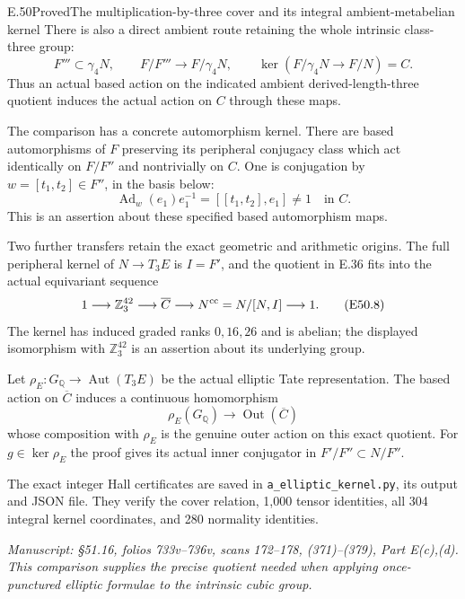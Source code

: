 \begin{statement}{E.50}{Proved}{The multiplication-by-three cover and its integral ambient-metabelian kernel}
There is also a direct ambient route retaining
the whole intrinsic class-three group:
\[
 F'''\subset\gamma_4N,\qquad
 F/F'''\longrightarrow F/\gamma_4N,
 \qquad
 \ker(F/\gamma_4N\longrightarrow F/N)=C.
 \tag{E50.6}
\]
Thus an actual based action on the indicated
ambient derived-length-three quotient induces
the actual action on $C$ through these maps.

The comparison has a concrete automorphism
kernel. There are based automorphisms of $F$
preserving its peripheral conjugacy class which
act identically on $F/F''$ and nontrivially on
$C$. One is conjugation by
$w=[t_1,t_2]\in F''$, in the basis below:
\[
 \operatorname{Ad}_w(e_1)e_1^{-1}
       =[[t_1,t_2],e_1]\ne1\quad\text{in }C.
 \tag{E50.7}
\]
This is an assertion about these specified
based automorphism maps.

Two further transfers retain the exact
geometric and arithmetic origins. The full
peripheral kernel of $N\to T_3E$ is
$I=F'$, and the quotient in E.36 fits into
the actual equivariant sequence
\[
 1\longrightarrow\mathbb Z_3^{42}
 \longrightarrow\overline C
 \longrightarrow N^{\rm cc}=N/[N,I]
 \longrightarrow1.
 \tag{E50.8}
\]
The kernel has induced graded ranks
$0,16,26$ and is abelian; the displayed
isomorphism with $\mathbb Z_3^{42}$ is
an assertion about its underlying group.

Let $\rho_E:G_{\mathbb Q}\to
\operatorname{Aut}(T_3E)$ be the actual
elliptic Tate representation. The based
action on $\overline C$ induces a
continuous homomorphism
\[
 \rho_E(G_{\mathbb Q})
       \longrightarrow\operatorname{Out}(\overline C)
 \tag{E50.9}
\]
whose composition with $\rho_E$ is the
genuine outer action on this exact
quotient. For $g\in\ker\rho_E$ the proof
gives its actual inner conjugator in
$F'/F''\subset N/F''$.

The exact integer Hall certificates are saved
in \texttt{a\_elliptic\_kernel.py}, its output
and JSON file. They verify the cover relation,
1,000 tensor identities, all 304 integral kernel
coordinates, and 280 normality identities.

\emph{Manuscript: \S51.16, folios 733v--736v,
scans 172--178, (371)--(379), Part E(c),(d).
This comparison supplies the precise quotient
needed when applying once-punctured elliptic
formulae to the intrinsic cubic group.}
\end{statement}
